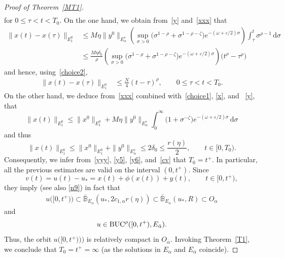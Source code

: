 \documentclass[reqno,11pt]{amsart}
\numberwithin{equation}{section}
\newcommand{\ve}{\varepsilon}
\newcommand{\rd}{\mathrm{d}}
\theoremstyle{remark}
\begin{document}
\begin{proof}[Proof of Theorem~\ref{MT1}]
\begin{equation}
\begin{aligned}
\end{aligned}
\end{equation}
for $0\le \tau< t< T_0$. On the one hand,  we obtain from~\eqref{y} and~\eqref{xxx} that
\begin{align*}
\|x(t)-x(\tau)\|_{E_1^0}
&\le  M\eta  \| y^0\|_{E_\alpha^s}\left(\sup_{\sigma>0}\big(\sigma^{1-\rho}+\sigma^{1-\rho-\zeta}\big)e^{-(\omega +\ve/2) \sigma}\right)\int_\tau^t \sigma^{\rho-1} \,\rd \sigma\\
&\le \frac{ M\eta \delta_0}{\rho} \left(\sup_{\sigma>0}\big(\sigma^{1-\rho}+\sigma^{1-\rho-\zeta}\big)e^{-(\omega +\ve/2) \sigma}\right) \big(t^\rho-\tau^\rho\big)
\end{align*}
and hence, using~\eqref{choice2},  
\begin{align}\label{y6}
\|x(t)-x(\tau)\|_{E_1^0}&\le \frac{N}{4} (t-\tau)^\rho, \qquad 0\le \tau< t< T_0.
\end{align}
On the other hand, we deduce from~\eqref{xxx} combined with~\eqref{choice1}, \eqref{x}, and~ \eqref{y},  that
\begin{equation*}
\|x(t)\|_{E_1^0}
\le \|x^0\|_{E_1^0}+  M \eta\| y^0\|_{E_\alpha^s} \int_0^\infty \big(1+\sigma^{-\zeta}\big)e^{-(\omega+\ve/2) \sigma} \,\rd \sigma
\end{equation*}
and thus
\begin{equation}\label{cv}
\|x(t)\|_{E_1^0}\le \|x^0\|_{E_1^0}+\| y^0\|_{E_\alpha^s}\le 2\delta_0\le \frac{r(\eta)}{2}, \qquad t\in [0,T_0).
\end{equation}
Consequently, we infer from~\eqref{yyy}, \eqref{y5}, \eqref{y6}, and~\eqref{cv} that $T_0=t^+$. In particular, all the previous estimates are valid on the interval $(0,t^+)$. Since 
$$
v(t)=u(t)-u_*=x(t)+\phi(x(t))+y(t),\qquad t\in [0,t^+),
$$
they imply  (see also \eqref{n9}) in fact that 
\begin{align}\label{stable4}
u\big([0,t^+)\big)\subset \bar{\mathbb{B}}_{E_\alpha}(u_*, 2 c_{1,\alpha}r(\eta))\subset \bar{\mathbb{B}}_{E_\alpha}( u_*,R)\subset O_\alpha
\end{align}
and
\begin{align*}
u\in {\rm BUC}^\rho([0,t^+),E_{\bar\alpha}).
\end{align*}
Thus, the orbit $u\big([0,t^+))\big)$ is relatively compact in $O_{\bar\alpha}$.
 Invoking  Theorem~\ref{T1}, we conclude that $T_0=t^+=\infty$ 
(as the solutions in $E_{\alpha}$ and $E_{\bar\alpha}$ coincide). 


\end{proof}
\end{document}
